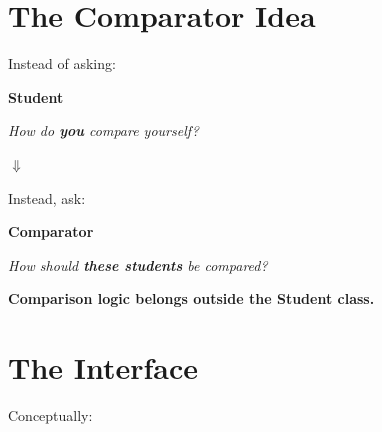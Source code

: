 \documentclass[11pt,a4paper]{book}
\begin{document}
\section{The Comparator Idea}

Instead of asking:

\begin{center}
\begin{tcolorbox}[
colback=RosettaRedBg,
colframe=RosettaRed,
boxrule=0.6pt,
arc=2mm,
width=0.72\textwidth,
halign=center]

\textbf{\textcolor{RosettaGray}{Student}}

\vspace{0.3em}

\textit{How do \textbf{you} compare yourself?}

\end{tcolorbox}
\end{center}

\begin{center}
{\Large\textcolor{RosettaGray}{$\Downarrow$}}
\end{center}

Instead, ask:

\begin{center}
\begin{tcolorbox}[
colback=RosettaDeepGreenBg,
colframe=RosettaDeepGreen,
boxrule=0.6pt,
arc=2mm,
width=0.72\textwidth,
halign=center]

\textbf{\textcolor{RosettaRoyalPurple}{Comparator}}

\vspace{0.3em}

\textit{How should \textbf{these students} be compared?}

\end{tcolorbox}
\end{center}

\vspace{0.8em}

\begin{center}
\colorbox{RosettaOrangeBg}{%
\parbox{0.72\textwidth}{%
\centering
\textbf{\textcolor{RosettaOrange}{Comparison logic belongs outside the Student class.}}
}}
\end{center}

\section{The Interface}

Conceptually:
\end{document}
